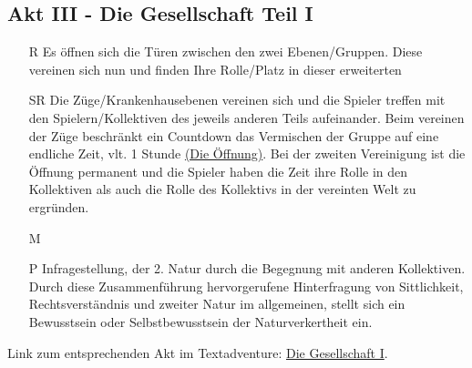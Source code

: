\documentclass[12pt, a4paper, openany]{report}
\begin{document}
\subsection{Akt III - Die Gesellschaft Teil I}
\begin{itemize}
  \item[R] Es öffnen sich die Türen zwischen den zwei Ebenen/Gruppen. Diese vereinen sich nun und finden Ihre Rolle/Platz in dieser erweiterten 
\item[SR] Die Züge/Krankenhausebenen vereinen sich und die Spieler treffen mit den Spielern/Kollektiven des jeweils anderen Teils aufeinander. 
Beim vereinen der Züge beschränkt ein Countdown das Vermischen der Gruppe auf eine endliche Zeit, vlt. 1 Stunde \hyperref[die-öffnung]{(Die Öffnung)}. 
Bei der zweiten Vereinigung ist die Öffnung permanent und die Spieler haben die Zeit ihre Rolle in den Kollektiven als auch die Rolle des Kollektivs in der vereinten Welt zu ergründen.
\item[M]
\item[P] Infragestellung, der 2. Natur durch die Begegnung mit anderen Kollektiven.
Durch diese Zusammenführung hervorgerufene Hinterfragung von Sittlichkeit, Rechtsverständnis und zweiter Natur im allgemeinen, stellt sich ein Bewusstsein oder Selbstbewusstsein der Naturverkertheit ein. 
\end{itemize}
Link zum entsprechenden Akt im Textadventure: \hyperref[die-gesellschaft]{Die Gesellschaft I}.
\end{document}
